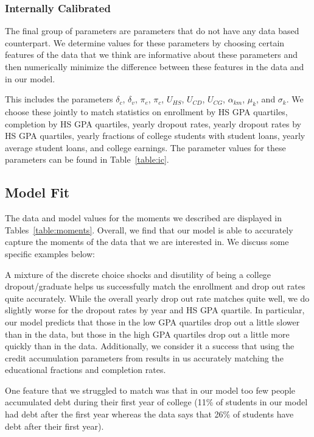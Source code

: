   \subsubsection{Internally Calibrated}

    The final group of parameters are parameters that do not have any data based counterpart. We
    determine values for these parameters by choosing certain features of the data that we think are
    informative about these parameters and then numerically minimize the difference between these
    features in the data and in our model.

    This includes the parameters $\delta_c$, $\delta_v$, $\pi_e$, $\pi_c$, $U_{HS}$, $U_{CD}$,
    $U_{CG}$, $\alpha_{km}$, $\mu_k$, and $\sigma_k$. We choose these jointly to match statistics on
    enrollment by HS GPA quartiles, completion by HS GPA quartiles, yearly dropout rates, yearly
    dropout rates by HS GPA quartiles, yearly fractions of college students with student loans,
    yearly average student loans, and college earnings. The parameter values for these parameters
    can be found in Table~\ref{table:ic}.


\subsection{Model Fit}

  The data and model values for the moments we described are displayed in
  Tables~\ref{table:moments}. Overall, we find that our model is able to accurately capture the
  moments of the data that we are interested in. We discuss some specific examples below:

  A mixture of the discrete choice shocks and disutility of being a college dropout/graduate helps
  us successfully match the enrollment and drop out rates quite accurately. While the overall yearly
  drop out rate matches quite well, we do slightly worse for the dropout rates by year and HS GPA
  quartile. In particular, our model predicts that those in the low GPA quartiles drop out a little
  slower than in the data, but those in the high GPA quartiles drop out a little more quickly than
  in the data. Additionally, we consider it a success that using the credit accumulation parameters
  from \cite{HendricksLeukhina2017} results in us accurately matching the educational fractions and
  completion rates.

  One feature that we struggled to match was that in our model too few people accumulated debt
  during their first year of college (11\% of students in our model had debt after the first year
  whereas the data says that 26\% of students have debt after their first year).
